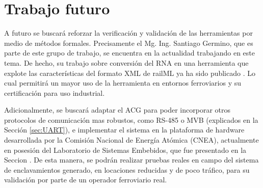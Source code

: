 \section{Trabajo futuro}

A futuro se buscará reforzar la verificación y validación de las herramientas por medio de métodos formales. Precisamente el Mg. Ing. Santiago Germino, que es parte de este grupo de trabajo, se encuentra en la actualidad trabajando en este tema. De hecho, su trabajo sobre conversión del RNA en una herramienta que explote las características del formato XML de railML ya ha sido publicado \cite{Paper_207}. Lo cual permitirá un mayor uso de la herramienta en entornos ferroviarios y su certificación para uso industrial.

Adicionalmente, se buscará adaptar el ACG para poder incorporar otros protocolos de comunicación mas robustos, como RS-485 o MVB (explicados en la Sección \ref{sec:UART}), e implementar el sistema en la plataforma de hardware desarrollada por la Comisión Nacional de Energía Atómica (CNEA), actualmente en posesión del Laboratorio de Sistemas Embebidos, que fue presentado en la Seccion \label{sec:GICSAFE}. De esta manera, se podrán realizar pruebas reales en campo del sistema de enclavamientos generado, en locaciones reducidas y de poco tráfico, para su validación por parte de un operador ferroviario real.



